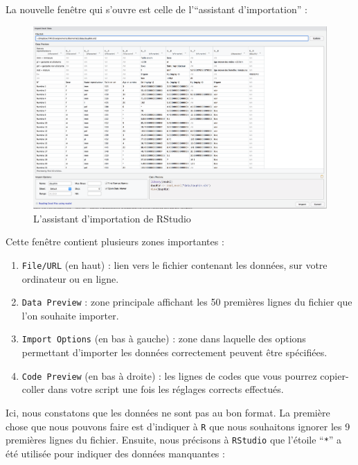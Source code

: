 \documentclass[
  letterpaper,
  DIV=11,
  numbers=noendperiod]{scrreprt}
\providecommand{\tightlist}{%
  \setlength{\itemsep}{0pt}\setlength{\parskip}{0pt}}\usepackage{longtable,booktabs,array}
\begin{document}
La nouvelle fenêtre qui s'ouvre est celle de l'``assistant
d'importation'' :

\begin{figure}

{\centering \includegraphics[width=1\textwidth,height=\textheight]{./images/import2.png}

}

\caption{L'assistant d'importation de RStudio}

\end{figure}

Cette fenêtre contient plusieurs zones importantes :

\begin{enumerate}
\def\labelenumi{\arabic{enumi}.}
\tightlist
\item
  \texttt{File/URL} (en haut) : lien vers le fichier contenant les
  données, sur votre ordinateur ou en ligne.
\item
  \texttt{Data\ Preview} : zone principale affichant les 50 premières
  lignes du fichier que l'on souhaite importer.
\item
  \texttt{Import\ Options} (en bas à gauche) : zone dans laquelle des
  options permettant d'importer les données correctement peuvent être
  spécifiées.
\item
  \texttt{Code\ Preview} (en bas à droite) : les lignes de codes que
  vous pourrez copier-coller dans votre script une fois les réglages
  corrects effectués.
\end{enumerate}

Ici, nous constatons que les données ne sont pas au bon format. La
première chose que nous pouvons faire est d'indiquer à \texttt{R} que
nous souhaitons ignorer les 9 premières lignes du fichier. Ensuite, nous
précisons à \texttt{RStudio} que l'étoile ``\texttt{*}'' a été utilisée
pour indiquer des données manquantes :
\end{document}
